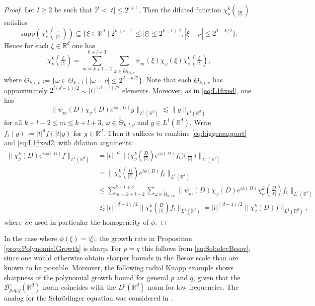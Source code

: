\documentclass{amsart}
\theoremstyle{definition}
\newcommand {\Rd}{\mathbb{R}^{d}}
\newcommand {\w}{\omega}
\newcommand {\Ba}{\mathcal{B}}
\newcommand {\supp}{\mathrm{supp}}
\numberwithin{equation}{section}
\begin{document}
\begin{proof}
Let $l\geq 2$ be such that $2^{l}<|t|\leq 2^{l+1}$. Then the dilated function $\chi_{\nu}^{k}(\frac{\cdot}{|t|})$ satisfies
\[
\supp(\chi_{\nu}^{k}(\tfrac{\cdot}{|t|}))\subseteq\{\xi\in\Rd\mid 2^{k+l-1}\leq |\xi|\leq 2^{k+l+2},|\hat{\xi}-\nu|\leq 2^{1-k/2}\}.
\]
Hence for each $\xi\in\Rd$ one has
\begin{equation}\label{eq:biggersupport}
\chi^{k}_{\nu}(\tfrac{\xi}{|t|})=\sum_{m=k+l-2}^{k+l+3}\sum_{\w\in\tilde{\Theta}_{k,l,\nu}}\psi_{m}(\xi)\chi_{\w}(\xi)\chi^{k}_{\nu}(\tfrac{\xi}{|t|}),
\end{equation}
where $\tilde{\Theta}_{k,l,\nu}:=\{\w\in \Theta_{k+l}\mid |\w-\nu|\leq 2^{2-k/2}\}$. Note that each $\tilde{\Theta}_{k,l,\nu}$ has approximately $2^{l(d-1)/2}\eqsim |t|^{(d-1)/2}$ elements. Moreover, as in \eqref{eq:L1fixed}, one has
\begin{equation}\label{eq:L1fixed2}
\|\psi_{m}(D)\chi_{\nu}(D)e^{i\phi(D)}g\|_{L^{1}(\Rd)}\lesssim \|g\|_{L^{1}(\Rd)}
\end{equation}
for all $k+l-2\leq m\leq k+l+3$, $\w\in \tilde{\Theta}_{k,l,\nu}$ and $g\in L^{1}(\Rd)$. Write $f_{t}(y):=|t|^{d}f(|t|y)$ for $y\in\Rd$. Then it suffices to combine \eqref{eq:biggersupport} and \eqref{eq:L1fixed2} with dilation arguments:
\begin{align*}
\|\chi_{\nu}^{k}(D)e^{it\phi(D)}f\|_{L^{1}(\Rd)}&=|t|^{-d}\big\|\big(\chi_{\nu}^{k}(\tfrac{D}{|t|})e^{i\phi(D)}f_{t}\big)\big(\tfrac{\cdot}{|t|}\big)\big\|_{L^{1}(\Rd)}\\
&=\|\chi_{\nu}^{k}(\tfrac{D}{|t|})e^{i\phi(D)}f_{t}\|_{L^{1}(\Rd)}\\
&\leq \sum_{m=k+l-2}^{k+l+3}\sum_{\w\in\tilde{\Theta}_{k,l,\nu}}\big\|\psi_{m}(D)\chi_{\w}(D)e^{i\phi(D)}\chi^{k}_{\nu}(\tfrac{D}{|t|})f_{t}\big\|_{L^{1}(\Rd)}\\
&\lesssim |t|^{(d-1)/2}\|\chi^{k}_{\nu}(\tfrac{D}{|t|})f_{t}\|_{L^{1}(\Rd)}=|t|^{(d-1)/2}\|\chi^{k}_{\nu}(D)f \|_{L^{1}(\Rd)},
\end{align*}
where we used in particular the homogeneity of $\phi$.
\end{proof}


In the case where $\phi(\xi)=|\xi|$, the growth rate in Proposition \ref{prop:PolynomialGrowth} is sharp. For $p=q$ this follows from \eqref{eq:SobolevBesov}, since one would otherwise obtain sharper bounds in the Besov scale than are known to be possible. Moreover, the following radial Knapp example shows sharpness of the polynomial growth bound for general $p$ and $q$, given that the $\Ba^{s}_{p,q,q}(\Rd)$ norm coincides with the $L^{p}(\Rd)$ norm for low frequencies. The analog for the Schr\"odinger equation was considered in \cite[Corollary~1.4]{Schippa2022}.
\end{document}
